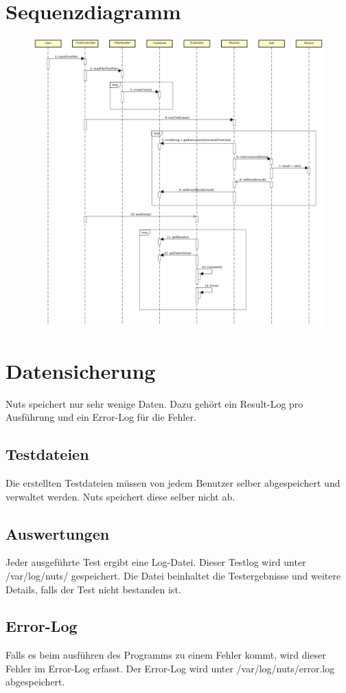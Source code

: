 \documentclass[a4,12pt]{scrartcl}
\begin{document}
\section{Sequenzdiagramm}
\begin{figure} [H]
	\begin{center}
	\includegraphics[width=1\textwidth]{./pictures/SequenceDiagram.png}
	\label{Bild Referenz}
	\end{center}
\end{figure}
\newpage
\section{Datensicherung}
Nuts speichert nur sehr wenige Daten. Dazu gehört ein Result-Log pro Ausführung und ein Error-Log für die Fehler.
\subsection{Testdateien}
Die erstellten Testdateien müssen von jedem Benutzer selber abgespeichert und verwaltet werden. Nuts speichert diese selber nicht ab.
\subsection{Auswertungen}
Jeder ausgeführte Test ergibt eine Log-Datei. Dieser Testlog wird unter /var/log/nuts/ gespeichert. Die Datei beinhaltet die Testergebnisse und weitere Details, falls der Test nicht bestanden ist.
\subsection{Error-Log}
Falls es beim ausführen des Programms zu einem Fehler kommt, wird dieser Fehler im Error-Log erfasst. Der Error-Log wird unter /var/log/nuts/error.log abgespeichert.
\end{document}

